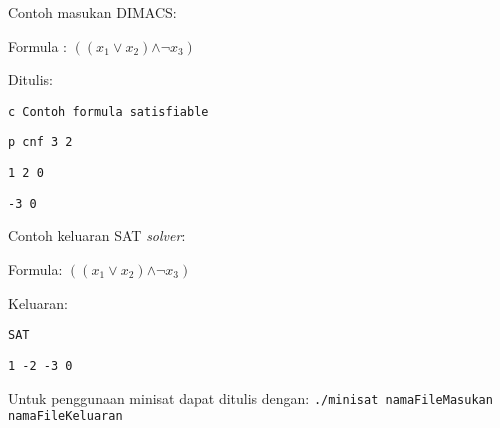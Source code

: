 Contoh masukan DIMACS:

Formula : $\left(\left(\ensuremath{x_{1}}\ensuremath{\vee}\ensuremath{x_{2}}\right)\ensuremath{\wedge\neg}\ensuremath{x_{3}}\right)$

Ditulis: 

\texttt{c Contoh formula satisfiable}

\texttt{p cnf 3 2} 

\texttt{1 2 0}

\texttt{-3 0}

\vspace{5mm}


Contoh keluaran SAT \textit{solver}:

Formula: $\left(\left(\ensuremath{x_{1}}\ensuremath{\vee}\ensuremath{x_{2}}\right)\ensuremath{\wedge\neg}\ensuremath{x_{3}}\right)$

\vspace{5mm}

Keluaran:

\texttt{SAT}

\texttt{1 -2 -3 0}

\vspace{5mm}

Untuk penggunaan minisat dapat ditulis dengan:
\texttt{./minisat namaFileMasukan namaFileKeluaran}

